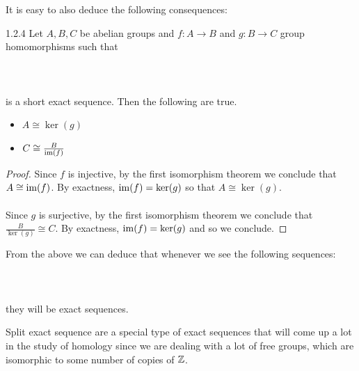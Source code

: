 \documentclass[a4paper]{article}
\begin{document}
It is easy to also deduce the following consequences: 

\begin{lmm}{}{1.2.4} Let $A,B,C$ be abelian groups and $f:A\to B$ and $g:B\to C$ group homomorphisms such that \\~\\
\\~\\
is a short exact sequence. Then the following are true. 
\begin{itemize}
\item $A\cong\ker(g)$
\item $C\cong\frac{B}{\operatorname{im}(f)}$
\end{itemize} \tcbline
\begin{proof}
Since $f$ is injective, by the first isomorphism theorem we conclude that $A\cong\operatorname{im}(f)$. By exactness, $\operatorname{im}(f)=\ker(g)$ so that $A\cong\ker(g)$. \\~\\

Since $g$ is surjective, by the first isomorphism theorem we conclude that $\frac{B}{\ker(g)}\cong C$. By exactness, $\operatorname{im}(f)=\ker(g)$ and so we conclude. 
\end{proof}
\end{lmm}

From the above we can deduce that whenever we see the following sequences: \\~\\
\\~\\
they will be exact sequences. 

Split exact sequence are a special type of exact sequences that will come up a lot in the study of homology since we are dealing with a lot of free groups, which are isomorphic to some number of copies of $\mathbb{Z}$. 
\end{document}
